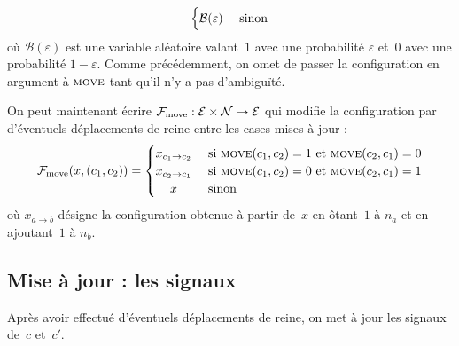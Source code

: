 \begin{itemize}
\[\begin{cases}
      \hfill \mathcal{B}(\varepsilon)\hfill  & \text{ sinon} \\
    \end{cases}
\]
où $\mathcal{B}(\varepsilon)$ est une variable aléatoire valant~$1$ avec une probabilité $\varepsilon$ et~$0$ avec une probabilité $1-\varepsilon$. Comme précédemment, on omet de passer la configuration en argument à $\textsc{move}$ tant qu'il n'y a pas d'ambiguïté.



\end{itemize}


On peut maintenant écrire $\mathcal{F}_{\mathrm{move}} : \mathcal{E}\times\mathcal{N}\to\mathcal{E}$ qui modifie la configuration par d'éventuels déplacements de reine entre les cases mises à jour :  \[
\mathcal{F}_{\mathrm{move}}(x,(c_1, c_2)) = 
\begin{cases}
  \hfill x_{c_1\to c_2} \hfill & \text{ si $\M(c_1, c_2) = 1$ et $\M(c_2, c_1) = 0$} \\
  \hfill x_{c_2 \to c_1} \hfill & \text{ si $\M(c_1, c_2) = 0$ et $\M(c_2, c_1) = 1$} \\
  \hfill x \hfill & \text{ sinon} \\
  \end{cases}
\]
où $x_{a \to b}$ désigne la configuration obtenue à partir de~$x$ en ôtant~$1$ à $n_{a}$ et en ajoutant~$1$ à $n_{b}$. 

\subsection{Mise à jour : les signaux}  

Après avoir effectué d'éventuels déplacements de reine, on met à jour les signaux de~$c$ et~$c'$. 

